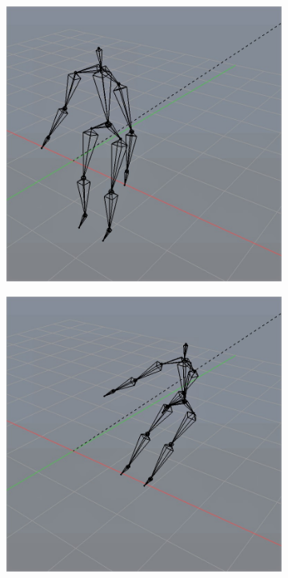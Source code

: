 \documentclass[10pt,twocolumn,letterpaper]{article}
\begin{document}
\begin{figure}[]
\begin{subfigure}{0.2\textwidth}
        \centering
        \includegraphics[width=.9\linewidth]{capped-cannon-50.jpg}
    \end{subfigure}\begin{subfigure}{0.2\textwidth}
        \centering
        \includegraphics[width=.9\linewidth]{capped-cannon-500.jpg}
    \end{subfigure}\begin{subfigure}{0.2\textwidth}

\end{subfigure}
\end{figure}
\end{document}
